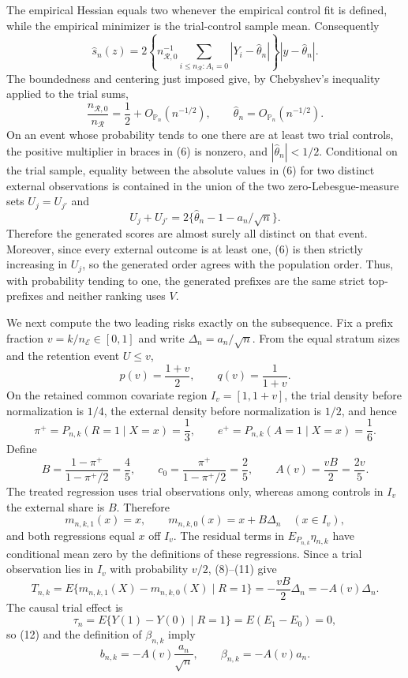The empirical Hessian equals two whenever the empirical control fit is defined, while the empirical minimizer is the trial-control sample mean.  Consequently
\[
 \widehat s_n(z)=
 2\left\{n_{\mathcal R,0}^{-1}
 \sum_{i\leq n_{\mathcal R}:A_i=0}|Y_i-\widehat\theta_n|\right\}
 |y-\widehat\theta_n|.
 \tag{6}
\]
The boundedness and centering just imposed give, by Chebyshev's inequality applied to the trial sums,
\[
 \frac{n_{\mathcal R,0}}{n_{\mathcal R}}=\frac12+O_{\mathbb P_n}(n^{-1/2}),
 \qquad
 \widehat\theta_n=O_{\mathbb P_n}(n^{-1/2}).
 \tag{7}
\]
On an event whose probability tends to one there are at least two trial controls, the positive multiplier in braces in (6) is nonzero, and \(|\widehat\theta_n|<1/2\).  Conditional on the trial sample, equality between the absolute values in (6) for two distinct external observations is contained in the union of the two zero-Lebesgue-measure sets \(U_j=U_{j'}\) and
\[
 U_j+U_{j'}=2\{\widehat\theta_n-1-a_n/\sqrt n\}.
\]
Therefore the generated scores are almost surely all distinct on that event.  Moreover, since every external outcome is at least one, (6) is then strictly increasing in \(U_j\), so the generated order agrees with the population order.  Thus, with probability tending to one, the generated prefixes are the same strict top-prefixes and neither ranking uses \(V\).

We next compute the two leading risks exactly on the subsequence.  Fix a prefix fraction \(v=k/n_{\mathcal E}\in[0,1]\) and write \(\Delta_n=a_n/\sqrt n\).  From the equal stratum sizes and the retention event \(U\leq v\),
\[
 p(v)=\frac{1+v}{2},
 \qquad q(v)=\frac1{1+v}.
 \tag{8}
\]
On the retained common covariate region \(I_v=[1,1+v]\), the trial density before normalization is \(1/4\), the external density before normalization is \(1/2\), and hence
\[
 \pi^+=P_{n,k}(R=1\mid X=x)=\frac13,
 \qquad e^+=P_{n,k}(A=1\mid X=x)=\frac16.
 \tag{9}
\]
Define
\[
 B=\frac{1-\pi^+}{1-\pi^+/2}=\frac45,
 \qquad c_0=\frac{\pi^+}{1-\pi^+/2}=\frac25,
 \qquad A(v)=\frac{vB}{2}=\frac{2v}{5}.
 \tag{10}
\]
The treated regression uses trial observations only, whereas among controls in \(I_v\) the external share is \(B\).  Therefore
\[
 m_{n,k,1}(x)=x,
 \qquad
 m_{n,k,0}(x)=x+B\Delta_n\quad(x\in I_v),
 \tag{11}
\]
and both regressions equal \(x\) off \(I_v\).  The residual terms in \(E_{P_{n,k}}\eta_{n,k}\) have conditional mean zero by the definitions of these regressions.  Since a trial observation lies in \(I_v\) with probability \(v/2\), (8)--(11) give
\[
 T_{n,k}
 =E\{m_{n,k,1}(X)-m_{n,k,0}(X)\mid R=1\}
 =-\frac{vB}{2}\Delta_n
 =-A(v)\Delta_n.
 \tag{12}
\]
The causal trial effect is
\[
 \tau_n=E\{Y(1)-Y(0)\mid R=1\}=E(E_1-E_0)=0,
\]
so (12) and the definition of \(\beta_{n,k}\) imply
\[
 b_{n,k}=-A(v)\frac{a_n}{\sqrt n},
 \qquad \beta_{n,k}=-A(v)a_n.
 \tag{13}
\]

